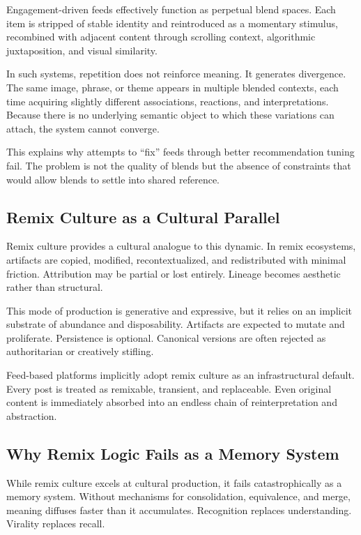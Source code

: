 \documentclass[11pt,oneside]{article}
\begin{document}
Engagement-driven feeds effectively function as perpetual blend spaces. Each item is stripped of stable identity and reintroduced as a momentary stimulus, recombined with adjacent content through scrolling context, algorithmic juxtaposition, and visual similarity.

In such systems, repetition does not reinforce meaning. It generates divergence. The same image, phrase, or theme appears in multiple blended contexts, each time acquiring slightly different associations, reactions, and interpretations. Because there is no underlying semantic object to which these variations can attach, the system cannot converge.

This explains why attempts to “fix” feeds through better recommendation tuning fail. The problem is not the quality of blends but the absence of constraints that would allow blends to settle into shared reference.

\subsection{Remix Culture as a Cultural Parallel}

Remix culture provides a cultural analogue to this dynamic. In remix ecosystems, artifacts are copied, modified, recontextualized, and redistributed with minimal friction. Attribution may be partial or lost entirely. Lineage becomes aesthetic rather than structural.

This mode of production is generative and expressive, but it relies on an implicit substrate of abundance and disposability. Artifacts are expected to mutate and proliferate. Persistence is optional. Canonical versions are often rejected as authoritarian or creatively stifling.

Feed-based platforms implicitly adopt remix culture as an infrastructural default. Every post is treated as remixable, transient, and replaceable. Even original content is immediately absorbed into an endless chain of reinterpretation and abstraction.

\subsection{Why Remix Logic Fails as a Memory System}

While remix culture excels at cultural production, it fails catastrophically as a memory system. Without mechanisms for consolidation, equivalence, and merge, meaning diffuses faster than it accumulates. Recognition replaces understanding. Virality replaces recall.
\end{document}

